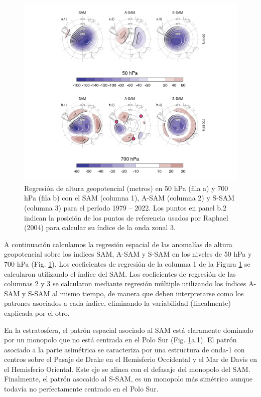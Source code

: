 \documentclass[12pt,oneside]{reedthesis}
\begin{document}
\begin{figure}
\includegraphics{figures/30-sam/2d-regr-1} \caption{Regresión de altura geopotencial (metros) en 50 hPa (fila a) y 700 hPa (fila b) con el SAM (columna 1), A-SAM (columna 2) y S-SAM (columna 3) para el período 1979 -- 2022.
Los puntos en panel b.2 indican la posición de los puntos de referencia usados por Raphael (2004) para calcular su índice de la onda zonal 3.}\label{fig:2d-regr}
\end{figure}

A continuación calculamos la regresión espacial de las anomalías de altura geopotencial sobre los índices SAM, A-SAM y S-SAM en los niveles de 50 hPa y 700 hPa (Fig. \ref{fig:2d-regr}).
Los coeficientes de regresión de la columna 1 de la Figura \ref{fig:2d-regr} se calcularon utilizando el índice del SAM.
Los coeficientes de regresión de las columnas 2 y 3 se calcularon mediante regresión múltiple utilizando los índices A-SAM y S-SAM al mismo tiempo, de manera que deben interpretarse como los patrones asociados a cada índice, eliminando la variabilidad (linealmente) explicada por el otro.

En la estratosfera, el patrón espacial asociado al SAM está claramente dominado por un monopolo que no está centrada en el Polo Sur (Fig. \ref{fig:2d-regr}a.1).
El patrón asociado a la parte asimétrica se caracteriza por una estructura de onda-1 con centros sobre el Pasaje de Drake en el Hemisferio Occidental y el Mar de Davis en el Hemisferio Oriental.
Este eje se alinea con el defasaje del monopolo del SAM.
Finalmente, el patrón asocaido al S-SAM, es un monopolo más simétrico aunque todavía no perfectamente centrado en el Polo Sur.
\end{document}
